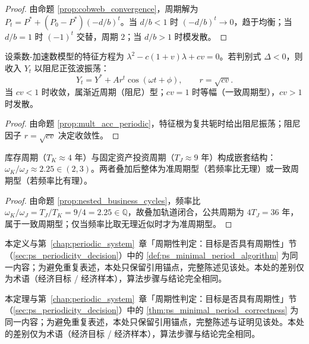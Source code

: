 \begin{proof}
由命题 \ref{prop:cobweb_convergence}，周期解为 $P_t=P^*+(P_0-P^*)(-d/b)^t$。当 $d/b<1$ 时 $(-d/b)^t\to0$，趋于均衡；当 $d/b=1$ 时 $(-1)^t$ 交替，周期 $2$；当 $d/b>1$ 时模发散。
\end{proof}

\begin{lemma}[乘数-加速数模型的周期判定]\label{lem:econ_mult_acc_periodic}
设乘数-加速数模型的特征方程为 $\lambda^2-c(1+v)\lambda+cv=0$。若判别式 $\Delta<0$，则收入 $Y_t$ 以阻尼正弦波振荡：
\[
Y_t=Y^*+Ar^t\cos(\omega t+\phi),\qquad r=\sqrt{cv}.
\]
当 $cv<1$ 时收敛，属渐近周期（阻尼）型；$cv=1$ 时等幅（一致周期型），$cv>1$ 时发散。
\end{lemma}

\begin{proof}
由命题 \ref{prop:mult_acc_periodic}，特征根为复共轭时给出阻尼振荡；阻尼因子 $r=\sqrt{cv}$ 决定收敛性。
\end{proof}

\begin{lemma}[库存周期与投资周期的嵌套判定]\label{lem:econ_nested_business_cycles}
库存周期（$T_K\approx4$ 年）与固定资产投资周期（$T_J\approx9$ 年）构成嵌套结构：$\omega_K/\omega_J\approx2.25\in(2,3)$。两者叠加后整体为准周期型（若频率比无理）或一致周期型（若频率比有理）。
\end{lemma}

\begin{proof}
由命题 \ref{prop:nested_business_cycles}，频率比 $\omega_K/\omega_J=T_J/T_K=9/4=2.25\in\mathbb Q$，故叠加轨道闭合，公共周期为 $4T_J=36$ 年，属于一致周期型；仅当频率比取无理近似时才为准周期型。
\end{proof}

\begin{definition}[经济最小正周期算法]\label{def:econ_minimal_period_algorithm}
本定义与第~\ref{chap:periodic_system}~章「周期性判定：目标是否具有周期性」节（\cref{sec:ps_periodicity_decision}）中的 \cref{def:ps_minimal_period_algorithm} 为同一内容；为避免重复表述，本处只保留引用锚点，完整陈述见该处。本处的差别仅为术语（经济目标 / 经济样本），算法步骤与结论完全相同。
\end{definition}

\begin{theorem}[经济最小正周期算法的正确性]\label{thm:econ_minimal_period_correctness}
本定理与第~\ref{chap:periodic_system}~章「周期性判定：目标是否具有周期性」节（\cref{sec:ps_periodicity_decision}）中的 \cref{thm:ps_minimal_period_correctness} 为同一内容；为避免重复表述，本处只保留引用锚点，完整陈述与证明见该处。本处的差别仅为术语（经济目标 / 经济样本），算法步骤与结论完全相同。
\end{theorem}

